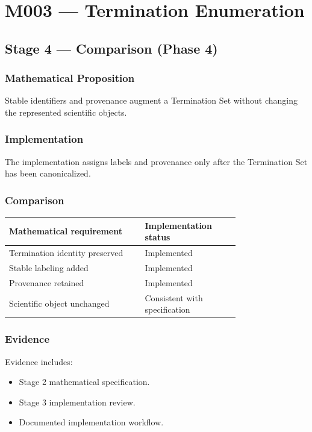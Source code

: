 \chapter{M003 --- Termination Enumeration}

\section{Stage 4 --- Comparison (Phase 4)}

\subsection{Mathematical Proposition}

Stable identifiers and provenance augment a Termination Set without
changing the represented scientific objects.

\subsection{Implementation}

The implementation assigns labels and provenance only after the
Termination Set has been canonicalized.

\subsection{Comparison}

\begin{center}
\begin{tabular}{|p{0.46\linewidth}|p{0.30\linewidth}|}
\hline
Mathematical requirement & Implementation status\\
\hline
Termination identity preserved & Implemented\\
Stable labeling added & Implemented\\
Provenance retained & Implemented\\
Scientific object unchanged & Consistent with specification\\
\hline
\end{tabular}
\end{center}

\subsection{Evidence}

Evidence includes:

\begin{itemize}
\item Stage 2 mathematical specification.
\item Stage 3 implementation review.
\item Documented implementation workflow.
\end{itemize}

